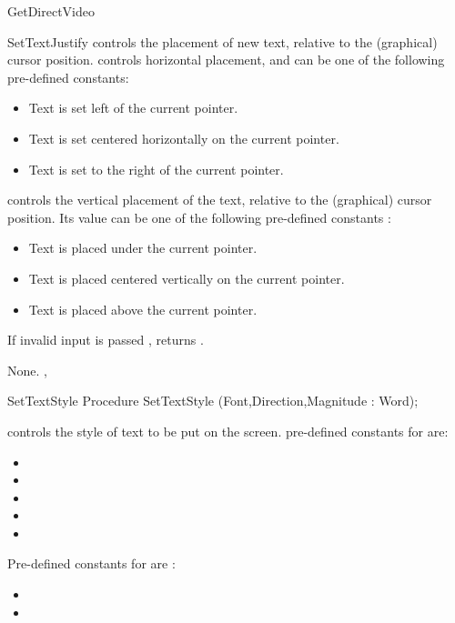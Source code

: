 \begin{function}{GetDirectVideo}
\begin{procedure}{SetTextJustify}
\Description
{} controls the placement of new text, relative to the
(graphical) cursor position.  controls horizontal placement, and can be
one of the following pre-defined constants:
\begin{itemize}
\item {} Text is set left of the current pointer.
\item {} Text is set centered horizontally on the current pointer.
\item {} Text is set to the right of the current pointer.
\end{itemize}
 controls the vertical placement of the text, relative to the
(graphical) cursor position. Its value can be one of the following
pre-defined constants :
\begin{itemize}
\item {} Text is placed under the current pointer.
\item {} Text is placed centered vertically on the current pointer.
\item {}Text is placed above the current pointer.
\end{itemize}

If invalid input is passed  ,  returns
.

\Errors
None.
\SeeAlso
{}, 
\end{procedure}
\begin{procedure}{SetTextStyle}
\Declaration
Procedure SetTextStyle (Font,Direction,Magnitude : Word);

\Description
{} controls the style of text to be put on the screen.
pre-defined constants for  are:
\begin{itemize}
\item {}
\item {}
\item {}
\item {}
\item {}
\end{itemize}


Pre-defined constants for  are :
\begin{itemize}
\item {}
\item {}
\end{itemize}


\end{procedure}
\end{function}
